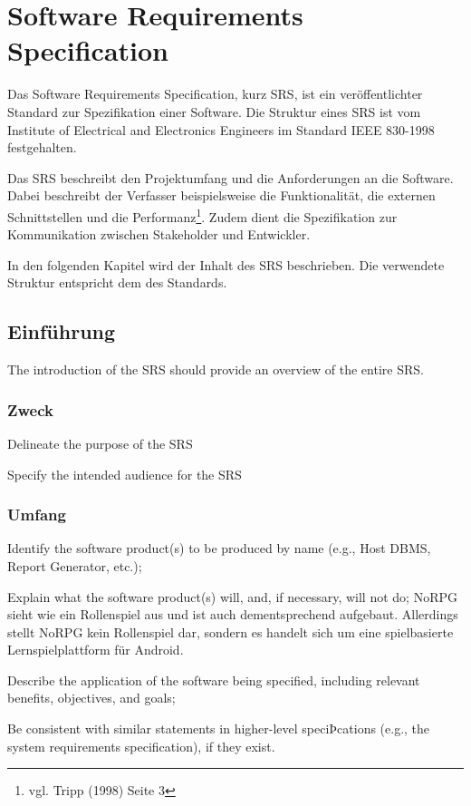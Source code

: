\chapter{Software Requirements Specification}
	Das Software Requirements Specification, kurz SRS, ist ein veröffentlichter Standard zur Spezifikation einer Software. Die Struktur eines SRS ist vom Institute of Electrical and Electronics Engineers im Standard IEEE 830-1998 festgehalten.
	
	Das SRS beschreibt den Projektumfang und die Anforderungen an die Software. Dabei beschreibt der Verfasser beispielsweise die Funktionalität, die externen Schnittstellen und die Performanz\footnote{vgl. Tripp \cite{srsIEEE}(1998) Seite 3}. Zudem dient die Spezifikation zur Kommunikation zwischen Stakeholder und Entwickler. 
	
	In den folgenden Kapitel wird der Inhalt des SRS beschrieben. Die verwendete Struktur entspricht dem des Standards.
	
\section{Einführung}
	The introduction of the SRS should provide an overview of the entire SRS.
	
	\subsection{Zweck}
		Delineate the purpose of the SRS
		
		Specify the intended audience for the SRS
	
	\subsection{Umfang}
		Identify the software product(s) to be produced by name (e.g., Host DBMS, Report Generator, etc.);
		
		Explain what the software product(s) will, and, if necessary, will not do;
			NoRPG sieht wie ein Rollenspiel aus und ist auch dementsprechend aufgebaut. Allerdings stellt NoRPG kein Rollenspiel dar, sondern es handelt sich um eine spielbasierte Lernspielplattform für Android.
		
		Describe the application of the software being specified, including relevant benefits, objectives, and goals;

		Be consistent with similar statements in higher-level speciÞcations (e.g., the system requirements specification), if they exist.

